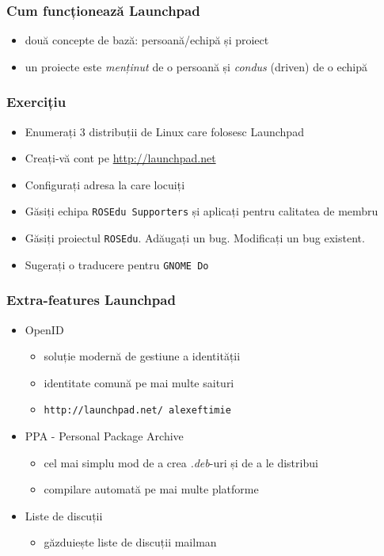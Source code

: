 \documentclass{beamer}
\begin{document}
\begin{frame}
\frametitle{Cum funcționează Launchpad}
\begin{itemize}
\item două concepte de bază: persoană/echipă și proiect
\item un proiecte este \emph{menținut} de o persoană și \emph{condus} (driven) de o echipă
\end{itemize}
\end{frame}

\begin{frame}
\frametitle{Exercițiu}
\begin{itemize}
\item Enumerați 3 distribuții de Linux care folosesc Launchpad
\item Creați-vă cont pe \url{http://launchpad.net}
\item Configurați adresa la care locuiți
\item Găsiți echipa \texttt{ROSEdu Supporters} și aplicați pentru calitatea de membru
\item Găsiți proiectul \texttt{ROSEdu}. Adăugați un bug. Modificați un bug existent.
\item Sugerați o traducere pentru \texttt{GNOME Do} %
\end{itemize}
\end{frame}

\begin{frame}
\frametitle{Extra-features Launchpad}
\begin{itemize}
\item OpenID
\begin{itemize}
\item soluție modernă de gestiune a identității
\item identitate comună pe mai multe saituri
\item \texttt{http://launchpad.net/~alexeftimie}
\end{itemize}
\item PPA - Personal Package Archive
\begin{itemize}
\item cel mai simplu mod de a crea \emph{.deb}-uri și de a le distribui
\item compilare automată pe mai multe platforme
\end{itemize}
\item Liste de discuții
\begin{itemize}
\item găzduiește liste de discuții mailman
\end{itemize}
\end{itemize}
\end{frame}
\end{document}
